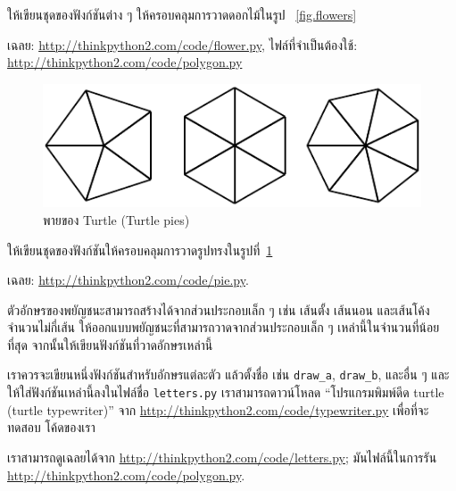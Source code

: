 \begin{exercise}

ให้เขียนชุดของฟังก์ชันต่าง ๆ ให้ครอบคลุมการวาดดอกไม้ในรูป ~\ref{fig.flowers}

เฉลย: \url{http://thinkpython2.com/code/flower.py},
ไฟล์ที่จำเป็นต้องใช้: \url{http://thinkpython2.com/code/polygon.py}

\end{exercise}

\begin{figure}
\centerline
{\includegraphics[scale=0.8]{figs/pies.pdf}}
\caption{พายของ Turtle (Turtle pies)}
\label{fig.pies}
\end{figure}


\begin{exercise}

ให้เขียนชุดของฟังก์ชันให้ครอบคลุมการวาดรูปทรงในรูปที่~\ref{fig.pies}

เฉลย: \url{http://thinkpython2.com/code/pie.py}.

\end{exercise}

\begin{exercise}

ตัวอักษรของพยัญชนะสามารถสร้างได้จากส่วนประกอบเล็ก ๆ เช่น เส้นตั้ง เส้นนอน และเส้นโค้งจำนวนไม่กี่เส้น
ให้ออกแบบพยัญชนะที่สามารถวาดจากส่วนประกอบเล็ก ๆ เหล่านี้ในจำนวนที่น้อยที่สุด
จากนั้นให้เขียนฟังก์ชันที่วาดอักษรเหล่านี้

เราควรจะเขียนหนึ่งฟังก์ชันสำหรับอักษรแต่ละตัว แล้วตั้งชื่อ เช่น \verb"draw_a", \verb"draw_b", และอื่น ๆ
และให้ใส่ฟังก์ชันเหล่านี้ลงในไฟล์ชื่อ {\tt letters.py} เราสามารถดาวน์โหลด ``โปรแกรมพิมพ์ดีด turtle 
(turtle typewriter)''  จาก \url{http://thinkpython2.com/code/typewriter.py} เพื่อที่จะทดสอบ
โค้ดของเรา

เราสามารถดูเฉลยได้จาก \url{http://thinkpython2.com/code/letters.py};
มันไฟล์นี้ในการรัน
\url{http://thinkpython2.com/code/polygon.py}.

\end{exercise}


